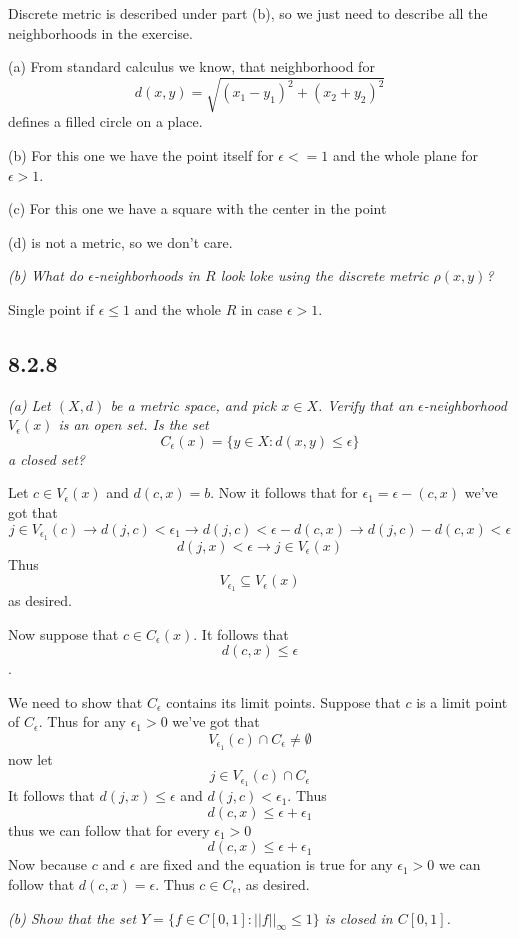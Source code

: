 \documentclass[11pt,oneside,titlepage]{book}
\begin{document}
Discrete metric is described under part (b), so we just need to describe all the neighborhoods
in the exercise.

(a) From standard calculus we know, that neighborhood for 
$$d(x, y) = \sqrt{(x_1 - y_1)^2 + (x_2 + y_2)^2}$$
defines a filled circle on a place.

(b) For this one we have the point itself for $\epsilon <= 1$ and the whole plane
for $\epsilon > 1$.


(c) For this one we have a square with the center in the point

(d) is not a metric, so we don't care.

\textit{(b) What do $\epsilon$-neighborhoods in $R$ look loke using the discrete metric
  $\rho(x, y)$?}

Single point if $\epsilon \leq 1$ and the whole $R$ in case $\epsilon > 1$.

\subsection*{8.2.8}
\textit{(a) Let $(X, d)$ be a metric space, and pick $x \in X$. Verify that an
  $\epsilon$-neighborhood $V_\epsilon(x)$ is an open set. Is the set }
$$C_\epsilon(x) = \{y \in X: d(x, y) \leq \epsilon\}$$
\textit{a closed set?}

Let $c \in V_\epsilon(x)$ and $d(c, x) = b$. 
Now it follows that for $\epsilon_1 = \epsilon - (c, x)$ we've got that
$$j \in V_{\epsilon_1}(c) \to d(j, c) < \epsilon_1 \to d(j, c) < \epsilon - d(c, x) \to
d(j, c)  - d(c, x)  < \epsilon $$
$$d(j, x) < \epsilon \to j \in V_\epsilon(x)$$
Thus
$$V_{\epsilon_1} \subseteq V_\epsilon(x)$$
as desired.

Now suppose that $c \in C_\epsilon(x)$. It follows that
$$d(c, x) \leq \epsilon$$.

We need to show that $C_\epsilon$ contains its limit points. Suppose that $c$ is a limit point
of $C_\epsilon$. Thus for any $\epsilon_1 > 0$ we've got that
$$V_{\epsilon_1}(c) \cap C_\epsilon \neq \emptyset$$
now let
$$j \in V_{\epsilon_1}(c) \cap C_\epsilon$$
It follows that $d(j, x) \leq \epsilon$ and $d(j, c) < \epsilon_1$. Thus
$$d(c, x) \leq \epsilon + \epsilon_1$$
thus we can follow that for every $\epsilon_1 > 0$
$$d(c, x) \leq \epsilon + \epsilon_1$$
Now because $c$ and $\epsilon$ are fixed and the equation is true for any $\epsilon_1 > 0$ we
can follow that $d(c, x) = \epsilon$. Thus $c \in C_\epsilon$, as desired.

\textit{(b) Show that the set $Y =\{f \in C[0, 1]: ||f||_\infty \leq 1\}$ is closed in $C[0, 1]$.}
\end{document}
